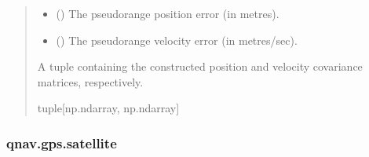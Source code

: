 \documentclass[letterpaper,10pt,english]{sphinxmanual}
\begin{document}
\begin{fulllineitems}
\begin{quote}
\begin{description}
\begin{itemize}
\item {} 
\sphinxAtStartPar
{} () \textendash{} The pseudo\sphinxhyphen{}range position error (in metres).

\item {} 
\sphinxAtStartPar
{} () \textendash{} The pseudo\sphinxhyphen{}range velocity error (in metres/sec).

\end{itemize}

\sphinxAtStartPar
A tuple containing the constructed position and velocity
covariance matrices, respectively.

\sphinxAtStartPar
tuple{[}np.ndarray, np.ndarray{]}

\end{description}\end{quote}

\end{fulllineitems}


\sphinxstepscope


\subsubsection{qnav.gps.satellite}
\label{\detokenize{modules/gps/satellite:module-qnav.gps.satellite}}\label{\detokenize{modules/gps/satellite:qnav-gps-satellite}}\label{\detokenize{modules/gps/satellite::doc}}
\end{document}
